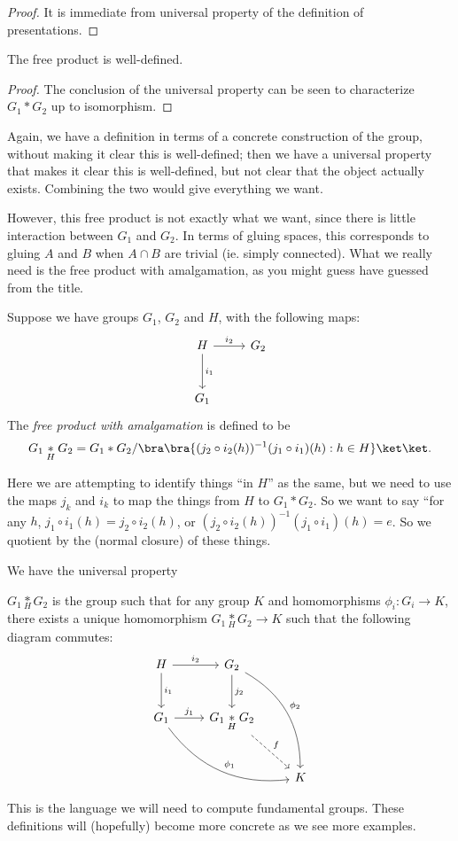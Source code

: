\documentclass[a4paper]{article}
\begin{document}
\begin{proof}
  It is immediate from universal property of the definition of presentations.
\end{proof}

\begin{cor}
  The free product is well-defined.
\end{cor}

\begin{proof}
  The conclusion of the universal property can be seen to characterize $G_1 * G_2$ up to isomorphism.
\end{proof}

Again, we have a definition in terms of a concrete construction of the group, without making it clear this is well-defined; then we have a universal property that makes it clear this is well-defined, but not clear that the object actually exists. Combining the two would give everything we want.

However, this free product is not exactly what we want, since there is little interaction between $G_1$ and $G_2$. In terms of gluing spaces, this corresponds to gluing $A$ and $B$ when $A \cap B$ are trivial (ie. simply connected). What we really need is the free product with amalgamation, as you might guess have guessed from the title.

\begin{defi}
  Suppose we have groups $G_1$, $G_2$ and $H$, with the following maps:
  \[
    \begin{tikzcd}[row sep=large]
      H \ar[r, "i_2"] \ar[d, "i_1"] & G_2\\
      G_1
    \end{tikzcd}
  \]
  The \emph{free product with amalgamation} is defined to be
  \[
    G_1 \underset{H}{*} G_2 = G_1 * G_2/ \bra \bra \{(j_2 \circ i_2(h))^{-1} (j_1 \circ i_1)(h): h\in H\}\ket \ket.
  \]
\end{defi}
Here we are attempting to identify things ``in $H$'' as the same, but we need to use the maps $j_k$ and $i_k$ to map the things from $H$ to $G_1 * G_2$. So we want to say ``for any $h$, $j_1 \circ i_1 (h) = j_2 \circ i_2(h)$, or $(j_2 \circ i_2(h))^{-1} (j_1 \circ i_1)(h) = e$. So we quotient by the (normal closure) of these things.

We have the universal property
\begin{lemma}
  $G_1 \underset{H}{*} G_2$ is the group such that for any group $K$ and homomorphisms $\phi_i: G_i \to K$, there exists a unique homomorphism $G_1 \underset{H}{*} G_2 \to K$ such that the following diagram commutes:
  \[
    \begin{tikzcd}[row sep=large]
      H \ar[r, "i_2"] \ar[d, "i_1"] & G_2 \ar[rdd, bend left, "\phi_2"] \ar[d, "j_2"]\\
      G_1 \ar[rrd, bend right, "\phi_1"] \ar [r, "j_1"] & G_1 \underset{H}{*} G_2 \ar [rd, dashed, "f"]\\
      && K
    \end{tikzcd}
  \]
\end{lemma}
This is the language we will need to compute fundamental groups. These definitions will (hopefully) become more concrete as we see more examples.
\end{document}

